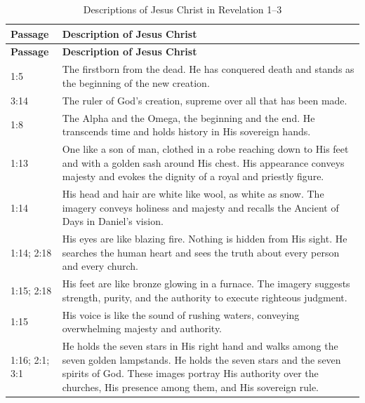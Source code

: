 \begin{longtable}{p{1.2cm} p{7.8cm}}
\caption{Descriptions of Jesus Christ in Revelation 1--3}
\label{tab:christ-revelation-1-3} \\

\hline
\textbf{Passage} & \textbf{Description of Jesus Christ} \\
\hline
\endfirsthead

\hline
\textbf{Passage} & \textbf{Description of Jesus Christ} \\
\hline
\endhead

\hline
\endfoot

\hline
\endlastfoot

1:5
& The firstborn from the dead. He has conquered death and stands as the beginning of the new creation. \\

3:14
& The ruler of God's creation, supreme over all that has been made. \\

1:8
& The Alpha and the Omega, the beginning and the end. He transcends time and holds history in His sovereign hands. \\

1:13
& One like a son of man, clothed in a robe reaching down to His feet and with a golden sash around His chest. His appearance conveys majesty and evokes the dignity of a royal and priestly figure. \\

1:14
& His head and hair are white like wool, as white as snow. The imagery conveys holiness and majesty and recalls the Ancient of Days in Daniel's vision. \\

1:14; 2:18
& His eyes are like blazing fire. Nothing is hidden from His sight. He searches the human heart and sees the truth about every person and every church. \\

1:15; 2:18
& His feet are like bronze glowing in a furnace. The imagery suggests strength, purity, and the authority to execute righteous judgment. \\

1:15
& His voice is like the sound of rushing waters, conveying overwhelming majesty and authority. \\

1:16; 2:1; 3:1
& He holds the seven stars in His right hand and walks among the seven golden lampstands. He holds the seven stars and the seven spirits of God. These images portray His authority over the churches, His presence among them, and His sovereign rule. \\


\end{longtable}
